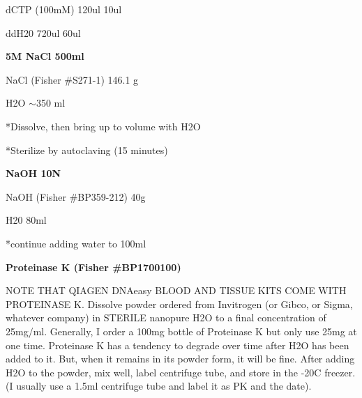 \documentclass[11pt, oneside]{article}
\begin{document}
			\hspace{2mm}dCTP (100mM)	\hspace{9mm} 120ul	\hspace{5mm}	10ul

			\hspace{2mm}ddH20 \hspace{25mm}		720ul	\hspace{5mm}	60ul
	
		\vspace{5mm}

		{\bf 5M NaCl 500ml}

			\hspace{2mm}NaCl	\hspace{5mm}  (Fisher \#S271-1) \hspace{3mm} 146.1 g

			\hspace{2mm}H2O 		\hspace{40mm}			$\sim$350 ml 

			\hspace{2mm}*Dissolve, then bring up to volume with H2O

			\hspace{2mm}*Sterilize by autoclaving (15 minutes)

		\vspace{5mm}

		{\bf NaOH 10N}

			\hspace{2mm}NaOH \hspace{2mm} (Fisher \#BP359-212) \hspace{5mm}	40g	

			\hspace{2mm}H20	\hspace{50mm}					80ml

			\hspace{2mm}*continue adding water to 100ml

		\vspace{5mm}

		{\bf Proteinase K (Fisher \#BP1700100)}

		\begin{adjustwidth}{0.25in}{0pt} NOTE THAT QIAGEN DNAeasy BLOOD AND TISSUE KITS COME WITH PROTEINASE K. Dissolve powder ordered from Invitrogen (or Gibco, or Sigma, whatever company) in STERILE nanopure H2O to a final concentration of 25mg/ml. Generally, I order a 100mg bottle of Proteinase K but only use 25mg at one time. Proteinase K has a tendency 		to degrade over time after H2O has been added to it. But, when it remains in its powder form, it will be fine. After adding H2O to the powder, mix well, label centrifuge tube, and store in the -20C freezer. (I usually use a 1.5ml centrifuge tube and label it as PK and the date). 
		\end{adjustwidth}
\end{document}
